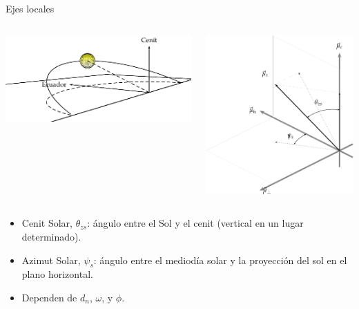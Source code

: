 \documentclass[xcolor={usenames,svgnames,dvipsnames}]{beamer}
\begin{document}
\begin{frame}[plain,label={sec:orgbc37073}]{Ejes locales}
\begin{columns}
\begin{column}{0.6\columnwidth}
\begin{center}
\includegraphics[width=.9\linewidth]{../figs/SoldesdeTierra2.pdf}
\end{center}
\end{column}

\begin{column}{0.6\columnwidth}
\begin{center}
\includegraphics[width=.9\linewidth]{../figs/SistemaCoordenadasLocal-crop.pdf}
\end{center}
\end{column}
\end{columns}

\begin{itemize}
\item \alert{Cenit Solar}, \(\theta_{zs}\): ángulo entre el Sol y el cenit (vertical en un lugar determinado).
\item \alert{Azimut Solar}, \(\psi_s\): ángulo entre el mediodía solar y la proyección del sol en el plano horizontal.
\item Dependen de \(d_n\), \(\omega\), y \(\phi\).
\end{itemize}
\end{frame}
\end{document}
